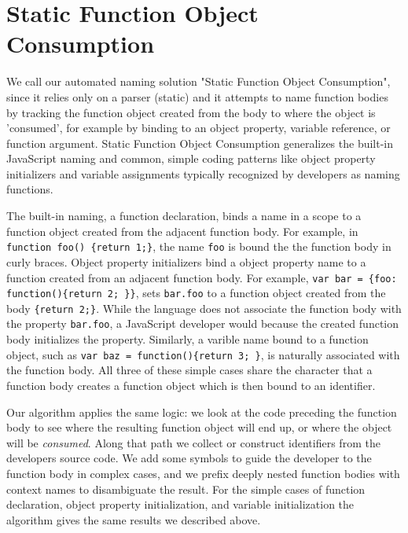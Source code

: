 \documentclass[10pt, preprint]{sigplanconf}
\begin{document}
\section{Static  Function Object Consumption}

We call our automated naming solution "Static Function Object Consumption", since it relies only on a parser (static) and it attempts to name function bodies by tracking the function object created from the body to where the object is 'consumed', for example by binding to an object property, variable reference, or function argument.
Static Function Object Consumption generalizes the built-in JavaScript naming and common, simple coding patterns like object property initializers and variable assignments typically recognized by developers as naming functions.

The built-in naming, a function declaration, binds a name in a scope to a function object created from the adjacent function body. For example, in  {\small\texttt{function foo() \{return 1;\}}}, the name  {\small\texttt{foo}} is bound the the function body in curly braces.
Object property initializers bind a object property name to a function created from an adjacent function body. For example,  {\small\texttt{var bar = \{foo: function()\{return 2; \}\}}}, sets {\small\texttt{bar.foo}} to a function object created from the body {\small\texttt{\{return 2;\}}}. While the language does not associate the function body with the property  {\small\texttt{bar.foo}}, a JavaScript developer would because the created function body initializes the property. Similarly, a varible name bound to a function object, such as {\small\texttt{var baz = function()\{return 3; \}}}, is naturally associated with the function body. All three of these simple cases share the character that a function body creates a function object which is then bound to an identifier. 

Our algorithm applies the same logic: we look at the code preceding the function body to see where the resulting function object will end up, or
where the object will be \textit{consumed}. Along that path we collect or construct identifiers from the developers source code. We add some symbols to guide the developer to the function body in complex cases, and we prefix deeply nested function bodies with context names to disambiguate the result.
For the simple cases of function declaration, object property initialization, and variable initialization the algorithm gives the same results we described above. 
\end{document}

